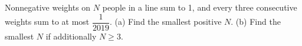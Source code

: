 Nonnegative weights on $ N $ people in a line sum to 1, and every three consecutive weights sum to at most $\dfrac{1}{2019}$. (a) Find the smallest positive $ N $. (b) Find the smallest $ N $ if additionally $ N\ge3 $.
